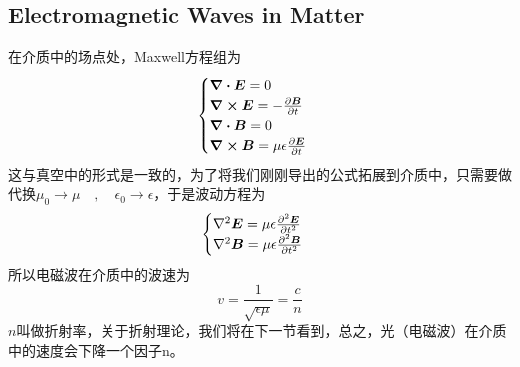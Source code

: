 \documentclass[14pt,oneside]{book}
\def \E{\vb*{E}}
\def \B{\vb*{B}}
\begin{document}
\begin{large}
\section{Electromagnetic Waves in Matter}
在介质中的场点处，Maxwell方程组为
\begin{align}
        \begin{cases}
                \div{\vb*{E}}=0\\
                \curl{\vb*{E}}=-\pdv{\vb*{B}}{t} \\
                \div{\vb*{B}}=0\\
                \curl{\vb*{B}}=\mu\epsilon\pdv{\vb*{E}}{t}& 
        \end{cases}
\end{align}
这与真空中的形式是一致的，为了将我们刚刚导出的公式拓展到介质中，只需要做代换$\mu_0\rightarrow\mu\quad,\quad \epsilon_0\rightarrow\epsilon$，于是波动方程为
\begin{align}
\begin{cases}
	\nabla^2\E=\mu\epsilon\pdv[2]{\E}{t}\\
	\nabla^2\B=\mu\epsilon\pdv[2]{\B}{t}
\end{cases}
\end{align}
所以电磁波在介质中的波速为
\begin{equation}
  v=\frac{1}{\sqrt{\epsilon\mu}}=\frac{c}{n}
\end{equation}
$n$叫做折射率，关于折射理论，我们将在下一节看到，总之，光（电磁波）在介质中的速度会下降一个因子n。


\end{large}
\end{document}
